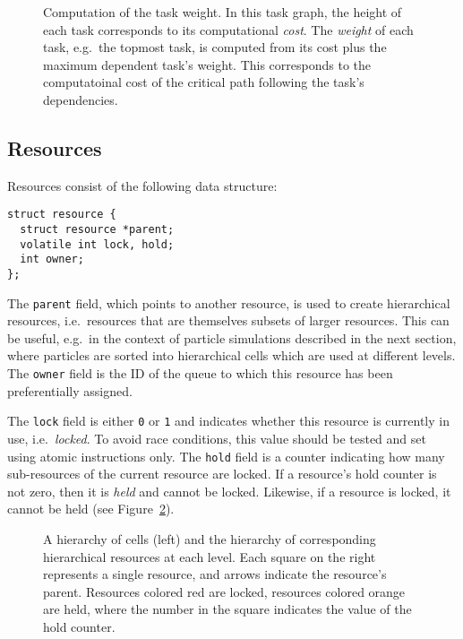 \documentclass[preprint]{elsarticle}
\newcommand{\fig}[1]
    {Figure~\ref{fig:#1}}
\begin{document}
\begin{figure}
    \centerline{}
    \caption{Computation of the task weight.
      In this task graph, the height of each task corresponds to its
      computational {\em cost}.
      The {\em weight} of each task, e.g.~the topmost task,
      is computed from its cost plus
      the maximum dependent task's weight.
      This corresponds to the computatoinal cost of the critical
      path following the task's dependencies.}
    \label{fig:TaskWeight}
\end{figure}


\subsection{Resources}

Resources consist of the following data structure:
\begin{center}\begin{minipage}{0.9\textwidth}
    \begin{lstlisting}
struct resource {
  struct resource *parent;
  volatile int lock, hold;
  int owner;
};
    \end{lstlisting}
\end{minipage}\end{center}

The {\tt parent} field, which points to another resource, is
used to create hierarchical resources, i.e.~resources
that are themselves subsets of larger resources.
This can be useful, e.g.~in the context of particle simulations
described in the next section, where particles are sorted
into hierarchical cells which are used at different levels.
The {\tt owner} field is the ID of the queue to which this
resource has been preferentially assigned.

The {\tt lock} field is either {\tt 0} or {\tt 1} and indicates
whether this resource is currently in use, i.e.~{\em locked}.
To avoid race conditions, this value should be tested
and set using atomic instructions only.
The {\tt hold} field is a counter indicating how many
sub-resources of the current resource are locked.
If a resource's hold counter is not zero, then it is
{\em held} and cannot be locked.
Likewise, if a resource is locked, it cannot be held
(see \fig{Resources}).

\begin{figure}
    \centerline{}
    \caption{A hierarchy of cells (left) and the hierarchy of
        corresponding hierarchical resources at each level.
        Each square on the right represents a single resource, and
        arrows indicate the resource's parent.
        Resources colored red are locked, resources colored orange
        are held, where the number in the square indicates the
        value of the hold counter.}
    \label{fig:Resources}
\end{figure}
\end{document}
